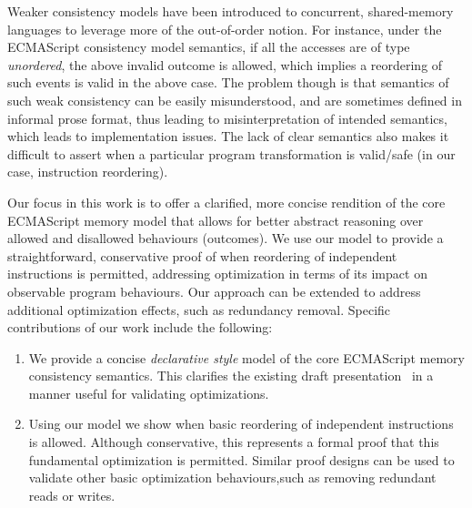     
    Weaker consistency models have been introduced to concurrent, shared-memory languages to leverage more of the \textit{}{out-of-order} notion. 
    For instance, under the ECMAScript consistency model semantics, if all the accesses are of type \textit{unordered}, the above invalid outcome is allowed, which implies a reordering of such events is valid in the above case. 
    The problem though is that semantics of such weak consistency can be easily misunderstood, and are sometimes defined in informal prose format, thus leading to misinterpretation of intended semantics, which leads to implementation issues. 
    The lack of clear semantics also makes it difficult to assert when a particular program transformation is valid/safe (in our case, instruction reordering).
    
    Our focus in this work is to offer a clarified, more concise rendition of the core ECMAScript memory model that allows for better abstract reasoning over allowed and disallowed behaviours (outcomes). 
    We use our model to provide a straightforward, conservative proof of when reordering of independent instructions is permitted, addressing optimization in terms of its impact on observable program behaviours. 
    Our approach can be extended to address additional optimization effects, such as redundancy removal. Specific contributions of our work include the following:
    
    \begin{enumerate}
        \item We provide a concise \textit{declarative style} model of the core ECMAScript memory consistency semantics. This clarifies the existing draft presentation~\cite{ECMA} in a manner useful for validating optimizations.
        \item Using our model we show when basic reordering of independent instructions is allowed. Although conservative, this represents a formal proof that this fundamental optimization is permitted. Similar proof designs can be used to validate other basic optimization behaviours,such as removing redundant reads or writes.
    \end{enumerate}
  